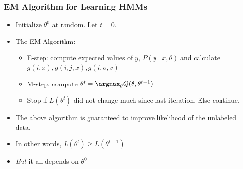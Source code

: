 \begin{frame}
\frametitle{EM Algorithm for Learning HMMs}
\begin{itemize}[<+->]
\item Initialize $\theta^0$ at random. Let $t=0$.
\item The EM Algorithm:
\begin{itemize}[<+->]
\item E-step: compute expected values of $y$, $P(y \mid x, \theta)$ and calculate $g(i,x), g(i,j,x), g(i,o,x)$
\item M-step: compute $\theta^{t} = \argmax_\theta Q(\theta, \theta^{t-1})$
\item Stop if $L(\theta^t)$ did not change much since last iteration. Else continue.
\end{itemize}
\item The above algorithm is guaranteed to improve likelihood of the unlabeled data.
\item In other words, $L(\theta^t) \geq L(\theta^{t-1})$
\item \emph{But} it all depends on $\theta^0$!
\end{itemize}
\end{frame}





